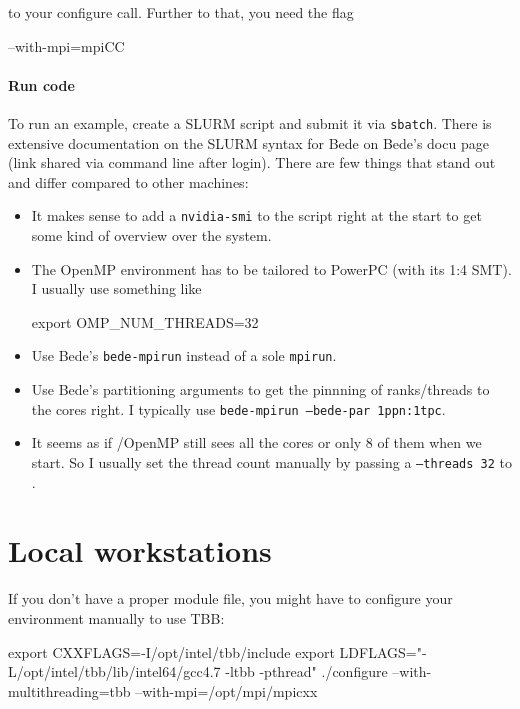 \noindent
to your configure call. Further to that, you need the flag 
\begin{code}
--with-mpi=mpiCC
\end{code}


\paragraph{Run code}

To run an example, create a SLURM script and submit it via \texttt{sbatch}.
There is extensive documentation on the SLURM syntax for Bede on Bede's docu
page (link shared via command line after login).
There are few things that stand out and differ compared to other machines:

\begin{itemize}
  \item It makes sense to add a \texttt{nvidia-smi} to the script right at the
  start to get some kind of overview over the system.
  \item The OpenMP environment has to be tailored to PowerPC (with its 1:4 SMT).
  I usually use something like
  \begin{code}
export OMP_NUM_THREADS=32  
  \end{code}
  \item Use Bede's \texttt{bede-mpirun} instead of a sole \texttt{mpirun}.
  \item Use Bede's partitioning arguments to get the pinnning of ranks/threads
  to the cores right. I typically use \texttt{bede-mpirun --bede-par 1ppn:1tpc}.
  \item It seems as if \Peano/OpenMP still sees all the cores or only 8 of them
  when we start. So I usually set the thread count manually by passing a
  \texttt{--threads 32} to \Peano.
\end{itemize}



\section{Local workstations}



If you don't have a proper module file, you might have to configure your environment manually to use TBB:
\begin{code}
 export CXXFLAGS=-I/opt/intel/tbb/include
 export LDFLAGS="-L/opt/intel/tbb/lib/intel64/gcc4.7 -ltbb -pthread"
 ./configure --with-multithreading=tbb --with-mpi=/opt/mpi/mpicxx
\end{code}


